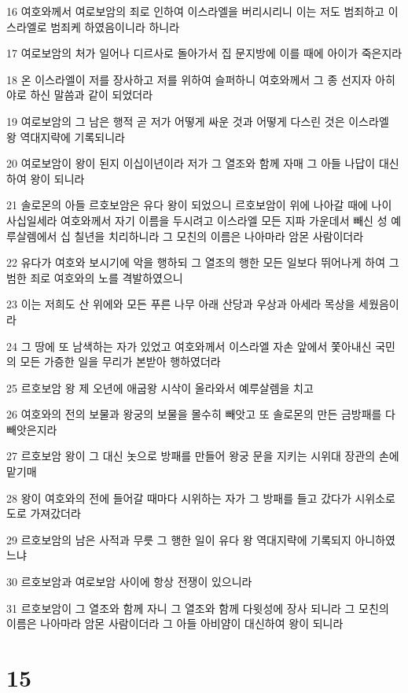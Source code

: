 \par 16 여호와께서 여로보암의 죄로 인하여 이스라엘을 버리시리니 이는 저도 범죄하고 이스라엘로 범죄케 하였음이니라 하니라
\par 17 여로보암의 처가 일어나 디르사로 돌아가서 집 문지방에 이를 때에 아이가 죽은지라
\par 18 온 이스라엘이 저를 장사하고 저를 위하여 슬퍼하니 여호와께서 그 종 선지자 아히야로 하신 말씀과 같이 되었더라
\par 19 여로보암의 그 남은 행적 곧 저가 어떻게 싸운 것과 어떻게 다스린 것은 이스라엘 왕 역대지략에 기록되니라
\par 20 여로보암이 왕이 된지 이십이년이라 저가 그 열조와 함께 자매 그 아들 나답이 대신하여 왕이 되니라
\par 21 솔로몬의 아들 르호보암은 유다 왕이 되었으니 르호보암이 위에 나아갈 때에 나이 사십일세라 여호와께서 자기 이름을 두시려고 이스라엘 모든 지파 가운데서 빼신 성 예루살렘에서 십 칠년을 치리하니라 그 모친의 이름은 나아마라 암몬 사람이더라
\par 22 유다가 여호와 보시기에 악을 행하되 그 열조의 행한 모든 일보다 뛰어나게 하여 그 범한 죄로 여호와의 노를 격발하였으니
\par 23 이는 저희도 산 위에와 모든 푸른 나무 아래 산당과 우상과 아세라 목상을 세웠음이라
\par 24 그 땅에 또 남색하는 자가 있었고 여호와께서 이스라엘 자손 앞에서 쫓아내신 국민의 모든 가증한 일을 무리가 본받아 행하였더라
\par 25 르호보암 왕 제 오년에 애굽왕 시삭이 올라와서 예루살렘을 치고
\par 26 여호와의 전의 보물과 왕궁의 보물을 몰수히 빼앗고 또 솔로몬의 만든 금방패를 다 빼앗은지라
\par 27 르호보암 왕이 그 대신 놋으로 방패를 만들어 왕궁 문을 지키는 시위대 장관의 손에 맡기매
\par 28 왕이 여호와의 전에 들어갈 때마다 시위하는 자가 그 방패를 들고 갔다가 시위소로 도로 가져갔더라
\par 29 르호보암의 남은 사적과 무릇 그 행한 일이 유다 왕 역대지략에 기록되지 아니하였느냐
\par 30 르호보암과 여로보암 사이에 항상 전쟁이 있으니라
\par 31 르호보암이 그 열조와 함께 자니 그 열조와 함께 다윗성에 장사 되니라 그 모친의 이름은 나아마라 암몬 사람이더라 그 아들 아비얌이 대신하여 왕이 되니라

\chapter{15}

